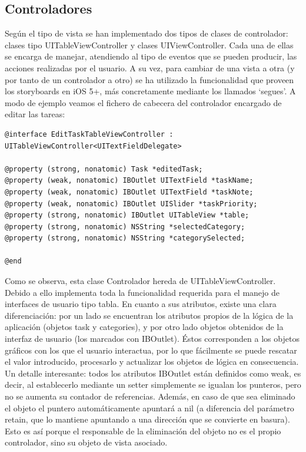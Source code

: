 \documentclass[parskip=half*]{scrartcl}
\begin{document}
\subsection{Controladores}

Seg\'un el tipo de vista se han implementado dos tipos de clases de controlador: clases tipo UITableViewController y clases UIViewController. Cada una de ellas se encarga de manejar, atendiendo al tipo de eventos que se pueden producir, las acciones realizadas por el usuario. A su vez, para cambiar de una vista a otra (y por tanto de un controlador a otro) se ha utilizado la funcionalidad que proveen los storyboards en iOS 5+, m\'as concretamente mediante los llamados `segues'.
A modo de ejemplo veamos el fichero de cabecera del controlador encargado de editar las tareas:

\begin{lstlisting}
@interface EditTaskTableViewController : UITableViewController<UITextFieldDelegate>

@property (strong, nonatomic) Task *editedTask;
@property (weak, nonatomic) IBOutlet UITextField *taskName;
@property (weak, nonatomic) IBOutlet UITextField *taskNote;
@property (weak, nonatomic) IBOutlet UISlider *taskPriority;
@property (strong, nonatomic) IBOutlet UITableView *table;
@property (strong, nonatomic) NSString *selectedCategory;
@property (strong, nonatomic) NSString *categorySelected;

@end
\end{lstlisting}

Como se observa, esta clase Controlador hereda de UITableViewController. Debido a ello implementa toda la funcionalidad requerida para el manejo de interfaces de usuario tipo tabla. En cuanto a sus atributos, existe una clara diferenciaci\'on: por un lado se encuentran los atributos propios de la l\'ogica de la aplicaci\'on (objetos task y categories), y por otro lado objetos obtenidos de la interfaz de usuario (los marcados con IBOutlet). \'Estos corresponden a los objetos gr\'aficos con los que el usuario interactua, por lo que f\'acilmente se puede rescatar el valor introducido, procesarlo y actualizar los objetos de l\'ogica en consecuencia. Un detalle interesante: todos los atributos IBOutlet est\'an definidos como weak, es decir, al establecerlo mediante un setter simplemente se igualan los punteros, pero no se aumenta su contador de referencias. Adem\'as, en caso de que sea eliminado el objeto el puntero autom\'aticamente apuntar\'a a nil (a diferencia del par\'ametro retain, que lo mantiene apuntando a una direcci\'on que se convierte en basura). Esto es as\'i porque el responsable de la eliminaci\'on del objeto no es el propio controlador, sino su objeto de vista asociado.
\end{document}
